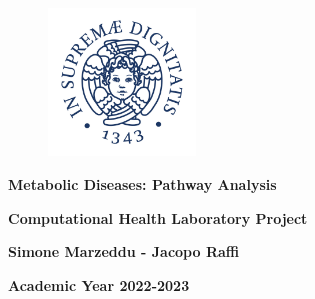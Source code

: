 \begin{titlepage}
\begin{center}
    \begin{figure}
        \centering
        \includegraphics[width=0.35\textwidth]{Images/logo.jpg}
    \end{figure}

\vskip 2cm
\begin{LARGE}
{\bf Metabolic Diseases: Pathway Analysis}
\\[3mm]
\end{LARGE}
\begin{large}
    \textbf{Computational Health Laboratory Project}
\end{large}
\vskip 2cm

\begin{large}
    \bf{Simone Marzeddu - Jacopo Raffi}
\end{large}

\vskip 2cm

\textbf{Academic Year 2022-2023}


\end{center}
\end{titlepage}